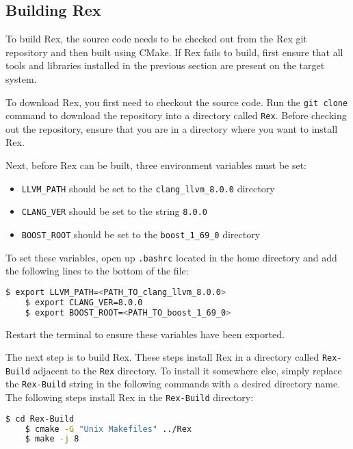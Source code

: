 \subsection{Building Rex}
\label{sec:RexBuild}

To build Rex, the source code needs to be checked out from the Rex git
repository and then built using CMake. If Rex fails to build, first ensure that
all tools and libraries installed in the previous section are present on the
target system.

To download Rex, you first need to checkout the source code. Run the \texttt{git
clone} command to download the repository into a directory called \texttt{Rex}.
Before checking out the repository, ensure that you are in a directory where you
want to install Rex.

\bigskip

\noindent Next, before Rex can be built, three environment variables must be
set:

\begin{itemize}
  \item \texttt{LLVM\_PATH} should be set to the \texttt{clang\_llvm\_8.0.0} directory
  \item \texttt{CLANG\_VER} should be set to the string \texttt{8.0.0}
  \item \texttt{BOOST\_ROOT} should be set to the \texttt{boost\_1\_69\_0} directory
\end{itemize}

\noindent To set these variables, open up \texttt{.bashrc} located in the home
directory and add the following lines to the bottom of the file:

\begin{lstlisting}[language=bash]
	$ export LLVM_PATH=<PATH_TO_clang_llvm_8.0.0>
	$ export CLANG_VER=8.0.0
	$ export BOOST_ROOT=<PATH_TO_boost_1_69_0>
\end{lstlisting}

\noindent Restart the terminal to ensure these variables have been exported.

\bigskip

\noindent The next step is to build Rex. These steps install Rex in a directory
called \texttt{Rex-Build} adjacent to the \texttt{Rex} directory. To install it
somewhere else, simply replace the \texttt{Rex-Build} string in the following
commands with a desired directory name. The following steps install Rex in the
\texttt{Rex-Build} directory:

\begin{lstlisting}[language=bash]
	$ cd Rex-Build
	$ cmake -G "Unix Makefiles" ../Rex
	$ make -j 8
\end{lstlisting}

